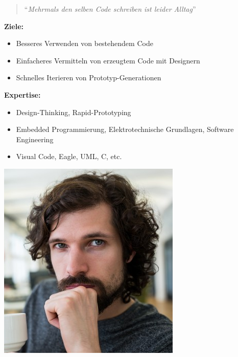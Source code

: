 \begin{tcolorbox}[title={Persona \#2, Mark, 28, Creative Technologist},toptitle=3mm,bottomtitle=3mm, bicolor ,sidebyside,righthand width=3cm, sharp corners, boxrule=.4pt, colback=green!5, colbacklower=green!5]
    \begin{quote}
        "`\textit{Mehrmals den selben Code schreiben ist leider Alltag}"'
    \end{quote}
    \textbf{Ziele:} 
    \begin{itemize}
        \item Besseres Verwenden von bestehendem Code
        \item Einfacheres Vermitteln von erzeugtem Code mit Designern
        \item Schnelles Iterieren von Prototyp-Generationen
    \end{itemize}
    \textbf{Expertise:} 
    \begin{itemize}
        \item Design-Thinking, Rapid-Prototyping
        \item Embedded Programmierung, Elektrotechnische Grundlagen, Software Engineering
        \item Visual Code, Eagle, UML, C, etc.
    \end{itemize}
    \tcblower
    \includegraphics[width=\linewidth]{bilder/chapter3/mark.png}
\end{tcolorbox}

